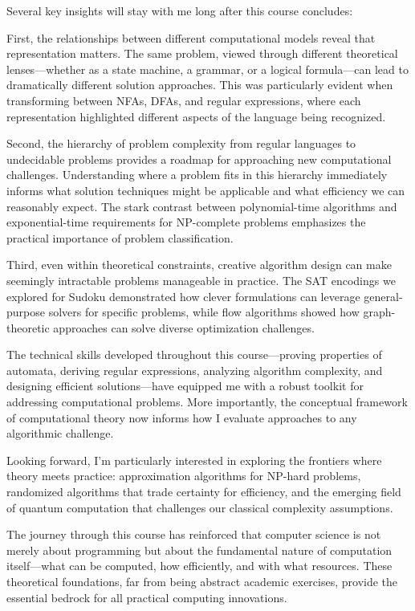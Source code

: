 \documentclass{article}
\theoremstyle{theorem}
\theoremstyle{definition}
\theoremstyle{remark}
\begin{document}
Several key insights will stay with me long after this course concludes:

First, the relationships between different computational models reveal that representation matters. The same problem, viewed through different theoretical lenses—whether as a state machine, a grammar, or a logical formula—can lead to dramatically different solution approaches. This was particularly evident when transforming between NFAs, DFAs, and regular expressions, where each representation highlighted different aspects of the language being recognized.

Second, the hierarchy of problem complexity from regular languages to undecidable problems provides a roadmap for approaching new computational challenges. Understanding where a problem fits in this hierarchy immediately informs what solution techniques might be applicable and what efficiency we can reasonably expect. The stark contrast between polynomial-time algorithms and exponential-time requirements for NP-complete problems emphasizes the practical importance of problem classification.

Third, even within theoretical constraints, creative algorithm design can make seemingly intractable problems manageable in practice. The SAT encodings we explored for Sudoku demonstrated how clever formulations can leverage general-purpose solvers for specific problems, while flow algorithms showed how graph-theoretic approaches can solve diverse optimization challenges.

The technical skills developed throughout this course—proving properties of automata, deriving regular expressions, analyzing algorithm complexity, and designing efficient solutions—have equipped me with a robust toolkit for addressing computational problems. More importantly, the conceptual framework of computational theory now informs how I evaluate approaches to any algorithmic challenge.

Looking forward, I'm particularly interested in exploring the frontiers where theory meets practice: approximation algorithms for NP-hard problems, randomized algorithms that trade certainty for efficiency, and the emerging field of quantum computation that challenges our classical complexity assumptions.

The journey through this course has reinforced that computer science is not merely about programming but about the fundamental nature of computation itself—what can be computed, how efficiently, and with what resources. These theoretical foundations, far from being abstract academic exercises, provide the essential bedrock for all practical computing innovations.
\end{document}
